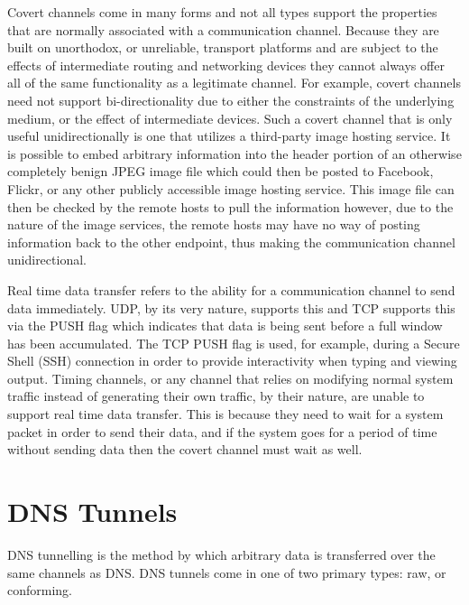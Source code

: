\documentclass[12pt]{report}
\theoremstyle{remark}
\theoremstyle{definition}
\theoremstyle{definition}
\theoremstyle{definition}
\begin{document}
Covert channels come in many forms and not all types support the properties that
are normally associated with a communication channel. Because they are built on
unorthodox, or unreliable, transport platforms and are subject to the effects of
intermediate routing and networking devices they cannot always offer all of the
same functionality as a legitimate channel. For example, covert channels need
not support bi-directionality due to either the constraints of the underlying
medium, or the effect of intermediate devices. Such a covert channel that is only
useful unidirectionally is one that utilizes a third-party image hosting service.
It is possible to embed arbitrary information into the header portion of an
otherwise completely benign JPEG image file\cite{isoeic10918-1} which could then
be posted to Facebook, Flickr, or any other publicly accessible image hosting
service. This image file can then be checked by the remote hosts to pull the
information however, due to the nature of the image services, the remote hosts
may have no way of posting information back to the other endpoint, thus making
the communication channel unidirectional.

Real time data transfer refers to the ability for a communication channel to
send data immediately. UDP, by its very nature, supports this and TCP supports
this via the PUSH flag which indicates that data is being sent before a full
window has been accumulated. The TCP PUSH flag is used, for example, during a
Secure Shell (SSH) connection in order to provide interactivity when typing and
viewing output. Timing channels, or any channel that relies on modifying normal
system traffic instead of generating their own traffic, by their nature, are
unable to support real time data transfer. This is because they need to wait for
a system packet in order to send their data, and if the system goes for a period
of time without sending data then the covert channel must wait as well.

\section{DNS Tunnels}
\label{tunnels-types}
DNS tunnelling is the method by which arbitrary data is transferred
over the same channels as DNS. DNS tunnels come in one of two primary types: raw, or
conforming.
\end{document}
